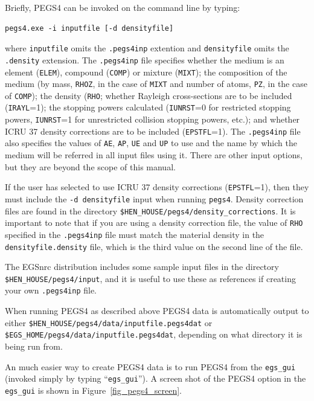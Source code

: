 \documentclass[12pt,twoside]{article}
\begin{document}
Briefly, PEGS4 can be invoked on the command line by typing:
\begin{verbatim}
pegs4.exe -i inputfile [-d densityfile]
\end{verbatim}
where {\tt inputfile} omits the {\tt .pegs4inp} extention and
{\tt densityfile} omits the {\tt .density} extension.  The {\tt .pegs4inp}
file specifies whether the medium is an element ({\tt ELEM}),
compound ({\tt COMP}) or mixture ({\tt MIXT}); the composition of
the medium (by mass, {\tt RHOZ}, in the case of {\tt MIXT} and
number of atoms, {\tt PZ}, in the case of {\tt COMP}); the density ({\tt RHO};
whether Rayleigh cross-sections are to be included ({\tt IRAYL}=1);
the stopping powers calculated ({\tt IUNRST}=0 for restricted stopping
powers, {\tt IUNRST}=1 for unrestricted collision stopping powers, etc.);
and whether ICRU 37 density corrections are to be included
({\tt EPSTFL}=1).  The {\tt .pegs4inp} file also specifies the
values of {\tt AE}, {\tt AP}, {\tt UE} and {\tt UP} to use and the
name by which the medium will be referred in all input files using it.
There are other input options, but they are beyond the scope of this
manual.

If the user has selected to use ICRU 37 density corrections ({\tt EPSTFL}=1),
then they must include the {\tt -d densityfile} input when running
{\tt pegs4}.  Density correction files are found in the directory
{\tt \$HEN\_HOUSE/pegs4/density\_corrections}.  It is important to note that
if you are using a density correction file, the value of {\tt RHO} specified
in the {\tt .pegs4inp} file must match the material density in the
{\tt densityfile.density} file, which is the third value on the second
line of the file.

The EGSnrc distribution includes some sample input files in the
directory {\tt \$HEN\_HOUSE/pegs4/input}, and it is useful to use these
as references if creating your own {\tt .pegs4inp} file.

When running PEGS4 as described above PEGS4 data is automatically output
to either
{\tt \$HEN\_HOUSE/pegs4/data/inputfile.pegs4dat} or
{\tt \$EGS\_HOME/pegs4/data/inputfile.pegs4dat}, depending on what
directory it is being run from.

An much easier way to create PEGS4 data is to run PEGS4 from
the {\tt egs\_gui} (invoked simply by typing ``{\tt egs\_gui}'').  A screen
shot of the PEGS4 option in the {\tt egs\_gui} is shown in
Figure~\ref{fig_pegs4_screen}.
\end{document}
